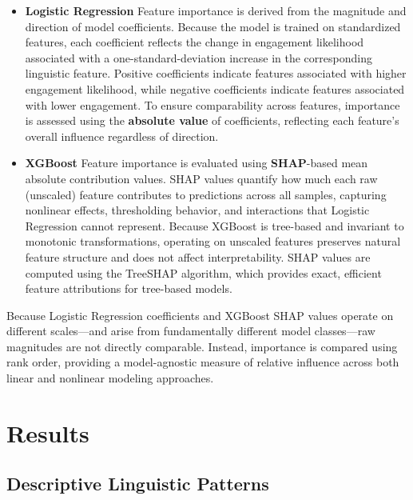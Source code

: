 \documentclass[12pt]{article}
\begin{document}
\begin{itemize}
\item \textbf{Logistic Regression}  
Feature importance is derived from the magnitude and direction of model coefficients. Because the model is trained on standardized features, each coefficient reflects the change in engagement likelihood associated with a one-standard-deviation increase in the corresponding linguistic feature. Positive coefficients indicate features associated with higher engagement likelihood, while negative coefficients indicate features associated with lower engagement. To ensure comparability across features, importance is assessed using the \textbf{absolute value} of coefficients, reflecting each feature's overall influence regardless of direction. 

\item \textbf{XGBoost}  
Feature importance is evaluated using \textbf{SHAP}-based mean absolute contribution values. SHAP values quantify how much each raw (unscaled) feature contributes to predictions across all samples, capturing nonlinear effects, thresholding behavior, and interactions that Logistic Regression cannot represent. Because XGBoost is tree-based and invariant to monotonic transformations, operating on unscaled features preserves natural feature structure and does not affect interpretability. SHAP values are computed using the TreeSHAP algorithm, which provides exact, efficient feature attributions for tree-based models.
\end{itemize}

Because Logistic Regression coefficients and XGBoost SHAP values operate on different scales—and arise from fundamentally different model classes—raw magnitudes are not directly comparable. Instead, importance is compared using rank order, providing a model-agnostic measure of relative influence across both linear and nonlinear modeling approaches.


\section{Results}

\subsection{Descriptive Linguistic Patterns}
\end{document}
